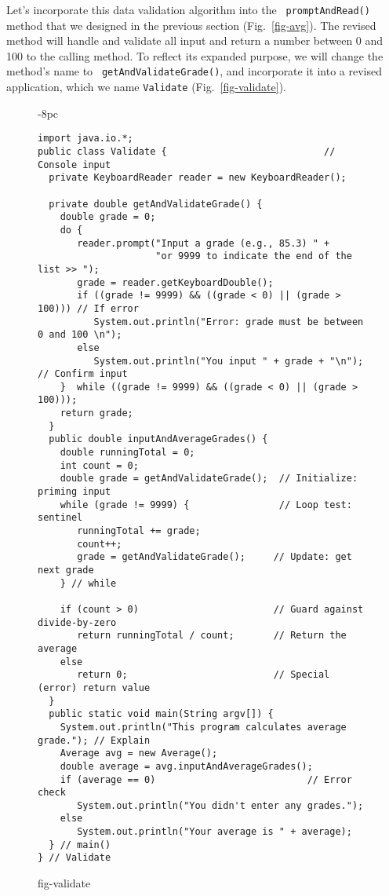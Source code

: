 Let's incorporate this data validation algorithm into the {\tt
prompt\-And\-Read()} method that we designed in the previous section
(Fig.~\ref{fig-avg}). The revised method will handle and validate all
input and return a number between 0 and 100 to the calling method. To
reflect its expanded purpose, we will change the method's name to {\tt
getAndValidateGrade()}, and incorporate it into a revised application,
which we name {\tt Validate} (Fig.~\ref{fig-validate}).

\begin{figure}[p]
\jjjprogstart
\begin{jjjlistingleft}[34pc]{-8pc}
\begin{lstlisting}
import java.io.*;
public class Validate {                            // Console input
  private KeyboardReader reader = new KeyboardReader();  

  private double getAndValidateGrade() {
    double grade = 0;
    do {
       reader.prompt("Input a grade (e.g., 85.3) " +
                     "or 9999 to indicate the end of the list >> ");
       grade = reader.getKeyboardDouble();
       if ((grade != 9999) && ((grade < 0) || (grade > 100))) // If error
          System.out.println("Error: grade must be between 0 and 100 \n");  
       else
          System.out.println("You input " + grade + "\n");  // Confirm input
    }  while ((grade != 9999) && ((grade < 0) || (grade > 100)));
    return grade;
  }
  public double inputAndAverageGrades() {
    double runningTotal = 0;
    int count = 0;
    double grade = getAndValidateGrade();  // Initialize: priming input
    while (grade != 9999) {                // Loop test: sentinel
       runningTotal += grade;                            
       count++;                                          
       grade = getAndValidateGrade();     // Update: get next grade
    } // while

    if (count > 0)                        // Guard against divide-by-zero
       return runningTotal / count;       // Return the average
    else
       return 0;                          // Special (error) return value
  }
  public static void main(String argv[]) {
    System.out.println("This program calculates average grade."); // Explain
    Average avg = new Average();
    double average = avg.inputAndAverageGrades();
    if (average == 0)                           // Error check
       System.out.println("You didn't enter any grades.");
    else
       System.out.println("Your average is " + average);        
  } // main()
} // Validate
\end{lstlisting}
\end{jjjlistingleft}
{fig-validate}
\end{figure}

